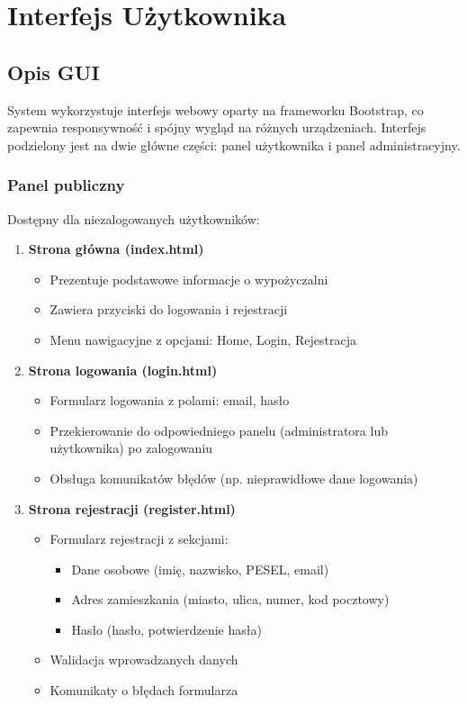 \documentclass[12pt,a4paper]{article}
\begin{document}
\newpage

\section{Interfejs Użytkownika}

\subsection{Opis GUI}

System wykorzystuje interfejs webowy oparty na frameworku Bootstrap, co zapewnia responsywność i spójny wygląd na różnych urządzeniach. Interfejs podzielony jest na dwie główne części: panel użytkownika i panel administracyjny.

\subsubsection{Panel publiczny}
Dostępny dla niezalogowanych użytkowników:

\begin{enumerate}
    \item \textbf{Strona główna (index.html)}
    \begin{itemize}
        \item Prezentuje podstawowe informacje o wypożyczalni
        \item Zawiera przyciski do logowania i rejestracji
        \item Menu nawigacyjne z opcjami: Home, Login, Rejestracja
    \end{itemize}
    
    \item \textbf{Strona logowania (login.html)}
    \begin{itemize}
        \item Formularz logowania z polami: email, hasło
        \item Przekierowanie do odpowiedniego panelu (administratora lub użytkownika) po zalogowaniu
        \item Obsługa komunikatów błędów (np. nieprawidłowe dane logowania)
    \end{itemize}
    
    \item \textbf{Strona rejestracji (register.html)}
    \begin{itemize}
        \item Formularz rejestracji z sekcjami:
        \begin{itemize}
            \item Dane osobowe (imię, nazwisko, PESEL, email)
            \item Adres zamieszkania (miasto, ulica, numer, kod pocztowy)
            \item Hasło (hasło, potwierdzenie hasła)
        \end{itemize}
        \item Walidacja wprowadzanych danych
        \item Komunikaty o błędach formularza
    \end{itemize}
\end{enumerate}
\end{document}
